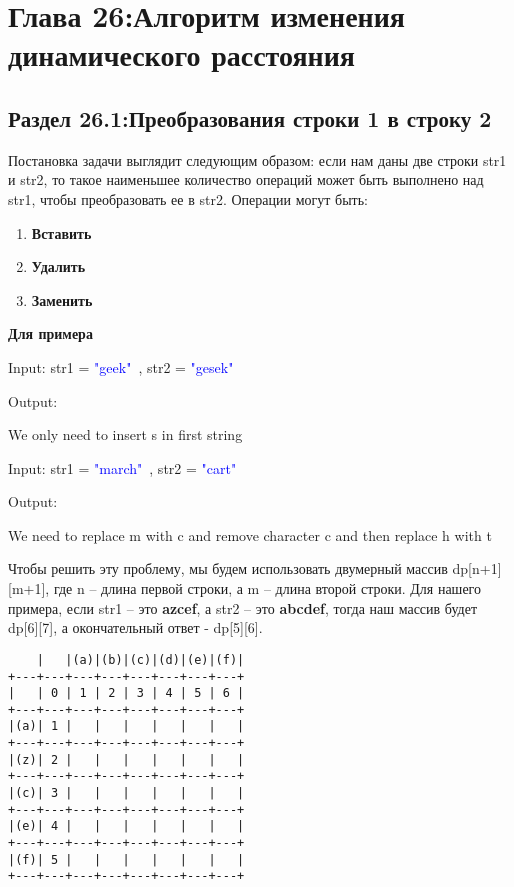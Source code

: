 \chapter*{Глава 26:Алгоритм изменения динамического  расстояния}

\section*{Раздел 26.1:Преобразования строки 1 в строку 2}

Постановка задачи выглядит следующим образом: если нам даны две строки str1 и str2, то такое наименьшее количество операций может быть выполнено над str1, чтобы преобразовать ее в str2. Операции могут быть:

\begin{enumerate}
    \item \textbf{Вставить}
    \item \textbf{Удалить}
    \item \textbf{Заменить}
\end{enumerate}

\textbf{Для примера}

\begin{tcolorbox}
Input: str1 = \textcolor{Blue}{"geek"\ }, str2 = \textcolor{Blue}{"gesek"\ }

Output: 

We only need to insert s in first string

Input: str1 = \textcolor{Blue}{"march"\ }, str2 = \textcolor{Blue}{"cart"\ }

Output: 

We need to replace m with c and remove character c and then replace h with t
\end{tcolorbox}

Чтобы решить эту проблему, мы будем использовать двумерный массив dp[n+1][m+1], где n -- длина первой строки, а m -- длина второй строки. Для нашего примера, если str1 -- это \textbf{azcef}, а str2 --  это \textbf{abcdef}, тогда наш массив будет dp[6][7], а окончательный ответ - dp[5][6].

\begin{tcolorbox}
\begin{verbatim}
    |   |(a)|(b)|(c)|(d)|(e)|(f)|
+---+---+---+---+---+---+---+---+
|   | 0 | 1 | 2 | 3 | 4 | 5 | 6 |
+---+---+---+---+---+---+---+---+
|(a)| 1 |   |   |   |   |   |   |   
+---+---+---+---+---+---+---+---+
|(z)| 2 |   |   |   |   |   |   |   
+---+---+---+---+---+---+---+---+
|(c)| 3 |   |   |   |   |   |   |   
+---+---+---+---+---+---+---+---+
|(e)| 4 |   |   |   |   |   |   |   
+---+---+---+---+---+---+---+---+
|(f)| 5 |   |   |   |   |   |   |   
+---+---+---+---+---+---+---+---+
\end{verbatim}
\end{tcolorbox}

